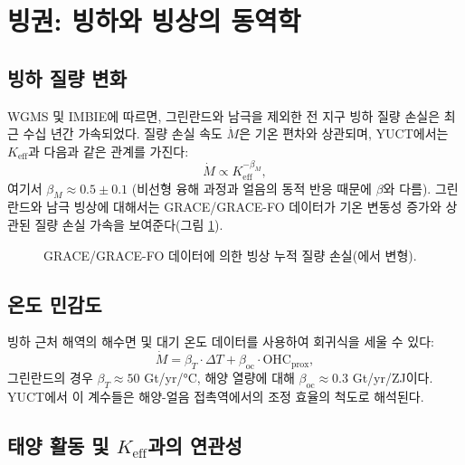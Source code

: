 \documentclass[11pt,a4paper]{article}
\newcommand{\Keff}{K_{\mathrm{eff}}}
\newcommand{\be}{\beta}
\begin{document}
	\section{빙권: 빙하와 빙상의 동역학}
	
	\subsection{빙하 질량 변화}
	
	WGMS 및 IMBIE에 따르면, 그린란드와 남극을 제외한 전 지구 빙하 질량 손실은 최근 수십 년간 가속되었다. 질량 손실 속도 $\dot{M}$은 기온 편차와 상관되며, YUCT에서는 $\Keff$과 다음과 같은 관계를 가진다:
	\[
	\dot{M} \propto \Keff^{-\beta_M},
	\]
	여기서 $\beta_M \approx 0.5 \pm 0.1$ (비선형 융해 과정과 얼음의 동적 반응 때문에 $\be$와 다름). 그린란드와 남극 빙상에 대해서는 GRACE/GRACE-FO 데이터가 기온 변동성 증가와 상관된 질량 손실 가속을 보여준다(그림 \ref{fig:grace}).
	
	\begin{figure}[htbp]
		\centering
		\caption{GRACE/GRACE-FO 데이터에 의한 빙상 누적 질량 손실(\cite{IMBIE}에서 변형).}
		\label{fig:grace}
	\end{figure}
	
	\subsection{온도 민감도}
	
	빙하 근처 해역의 해수면 및 대기 온도 데이터를 사용하여 회귀식을 세울 수 있다:
	\[
	\dot{M} = \beta_T \cdot \Delta T + \beta_{\text{oc}} \cdot \text{OHC}_{\text{prox}},
	\]
	그린란드의 경우 $\beta_T \approx 50$ Gt/yr/°C, 해양 열량에 대해 $\beta_{\text{oc}} \approx 0.3$ Gt/yr/ZJ이다. YUCT에서 이 계수들은 해양-얼음 접촉역에서의 조정 효율의 척도로 해석된다.
	
	\subsection{태양 활동 및 $\Keff$과의 연관성}
	
\end{document}
